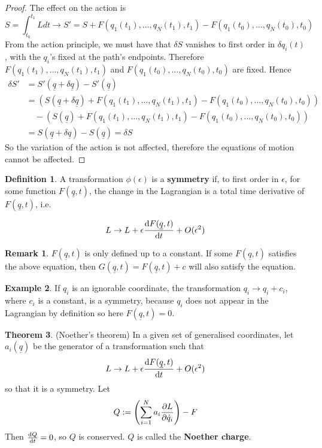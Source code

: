 \documentclass[12pt,a4paper]{article}
\theoremstyle{definition}
\newtheorem{definition}{Definition}[subsection]
\newtheorem{theorem}[definition]{Theorem}
\newtheorem{example}[definition]{Example}
\newtheorem*{remark}{Remark}
\begin{document}
\begin{proof}
	The effect on the action is
	\[
		S = \int_{t_0}^{t_1} L dt \rightarrow S' = S + F(q_1(t_1), \dots, q_N(t_1), t_1) - F(q_1(t_0), \dots, q_N(t_0), t_0)
	\]
	From the action principle, we must have that $\delta S$ vanishes to first order in $\delta q_i(t)$, with the $q_i$'s fixed at the path's endpoints. Therefore $F(q_1(t_1), \dots, q_N(t_1), t_1)$ and $F(q_1(t_0), \dots, q_N(t_0), t_0)$ are fixed. Hence
	\[
		\begin{aligned}
			\delta S' & = S'(\underline{q} + \delta \underline{q}) - S'(\underline{q}) \\
			& = (S(\underline{q} + \delta \underline{q}) + F(q_1(t_1), \dots, q_N(t_1), t_1) - F(q_1(t_0), \dots, q_N(t_0), t_0)) \\
			& \quad - (S(\underline{q}) + F(q_1(t_1), \dots, q_N(t_1), t_1) - F(q_1(t_0), \dots, q_N(t_0), t_0)) \\
			& = S(\underline{q} + \delta\underline{q}) - S(\underline{q}) = \delta S
		\end{aligned}
	\]
	So the variation of the action is not affected, therefore the equations of motion cannot be affected.
\end{proof}

\begin{definition}
	A transformation $\phi(\epsilon)$ is a \textbf{symmetry} if, to first order in $\epsilon$, for some function $F(\underline{q}, t)$, the change in the Lagrangian is a total time derivative of $F(\underline{q}, t)$, i.e.

	\[
		L \rightarrow L + \epsilon \diff{F(\underline{q}, t)}{t} + O(\epsilon^2)
	\]
\end{definition}

\begin{remark}
	$F(\underline{q}, t)$ is only defined up to a constant. If some $F(\underline{q}, t)$ satisfies the above equation, then $G(\underline{q}, t) = F(\underline{q}, t) + c$ will also satisfy the equation.
\end{remark}

\begin{example}
	If $q_i$ is an ignorable coordinate, the transformation $q_i \rightarrow q_i + c_i$, where $c_i$ is a constant, is a symmetry, because $q_i$ does not appear in the Lagrangian by definition so here $F(\underline{q}, t) = 0$.
\end{example}

\begin{theorem}
	(Noether's theorem) In a given set of generalised coordinates, let $a_i(\underline{q})$ be the generator of a transformation such that
	\[
		L \rightarrow L + \epsilon \diff{F(\underline{q}, t)}{t} + O(\epsilon^2)
	\]
	so that it is a symmetry. Let
	\[
		Q := \left( \sum_{i = 1}^N a_i \diffp{L}{\dot{q}_i} \right) - F
	\]
	Then $\diff{Q}{t} = 0$, so $Q$ is conserved. $Q$ is called the \textbf{Noether charge}.
\end{theorem}
\end{document}
